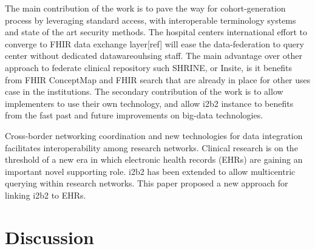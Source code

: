 \documentclass{amia}
\begin{document}
The main contribution of the work is to pave the way for cohort-generation process by leveraging standard access, with interoperable terminology systems and state of the art security methods. The hospital centers international effort to converge to FHIR data exchange layer[ref] will ease the data-federation to query center without dedicated datawareouhsing staff. The main advantage over other approach to federate clinical repository such SHRINE, or Insite, is it benefits from FHIR ConceptMap and FHIR search that are already in place for other uses case in the institutions.
The secondary contribution of the work is to allow implementers to use their own technology, and allow i2b2 instance to benefits from the fast past and future improvements on big-data technologies.

Cross-border networking coordination and new technologies for data integration facilitates interoperability among research networks. Clinical research is on the threshold of a new era in which electronic health records (EHRs) are gaining an important novel supporting role. i2b2 has been extended to allow multicentric querying within research networks.  This paper proposed a new approach for linking i2b2 to EHRs.

\section*{Discussion}
\end{document}
